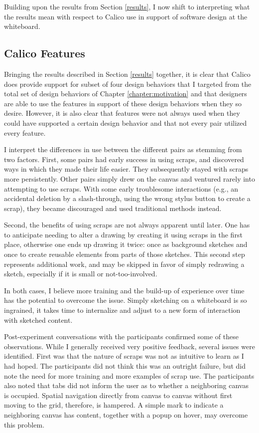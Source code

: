 Building upon the results from Section \ref{results}, I now shift to interpreting what the results mean with respect to Calico use in support of software design at the whiteboard.

\subsection {Calico Features}
\label{discussion:1}

Bringing the results described in Section \ref{results} together, it is clear that Calico does provide support for subset of four design behaviors that I targeted from the total set of design behaviors of Chapter \ref{chapter:motivation} and that designers are able to use the features in support of these design behaviors when they so desire. However, it is also clear that features were not always used when they could have supported a certain design behavior and that not every pair utilized every feature.

I interpret the differences in use between the different pairs as stemming from two factors. First, some pairs had early success in using scraps, and discovered ways in which they made their life easier. They subsequently stayed with scraps more persistently. Other pairs simply drew on the canvas and ventured rarely into attempting to use scraps. With some early troublesome interactions (e.g., an accidental deletion by a slash-through, using the wrong stylus button to create a scrap), they became discouraged and used traditional methods instead. 

Second, the benefits of using scraps are not always apparent until later. One has to anticipate needing to alter a drawing by creating it using scraps in the first place, otherwise one ends up drawing it twice: once as background sketches and once to create reusable elements from parts of those sketches. This second step represents additional work, and may be skipped in favor of simply redrawing a sketch, especially if it is small or not-too-involved. 

In both cases, I believe more training and the build-up of experience over time has the potential to overcome the issue. Simply sketching on a whiteboard is so ingrained, it takes time to internalize and adjust to a new form of interaction with sketched content. 

Post-experiment conversations with the participants confirmed some of these observations. While I generally received very positive feedback, several issues were identified. First was that the nature of scraps was not as intuitive to learn as I had hoped. The participants did not think this was an outright failure, but did note the need for more training and more examples of scrap use. The participants also noted that tabs did not inform the user as to whether a neighboring canvas is occupied. Spatial navigation directly from canvas to canvas without first moving to the grid, therefore, is hampered. A simple mark to indicate a neighboring canvas has content, together with a popup on hover, may overcome this problem. 

